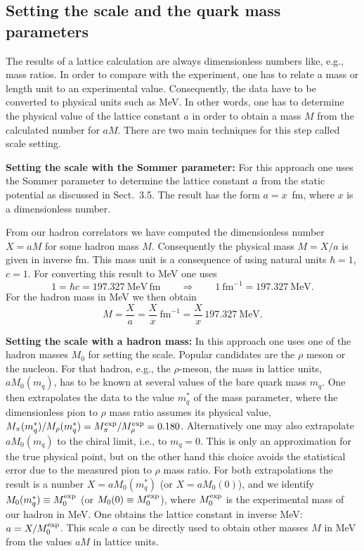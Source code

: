 \subsection{Setting the scale and the quark mass parameters}

The results of a lattice calculation are always dimensionless numbers like,
e.g., mass ratios. In order to compare with the experiment, one has to relate a
mass or length unit to an experimental value. Consequently, the data have to be
converted to physical units such as MeV. In other words, one has to determine
the physical value of the lattice constant $a$ in order to obtain a mass $M$
from the calculated number for $aM$. There are two main techniques for this
step called scale setting.

\textbf{Setting the scale with the Sommer parameter:} For this approach one
uses the Sommer parameter to determine the lattice constant $a$ from the static
potential as discussed in Sect.~3.5. The result has the form $a = x$~fm, where
$x$ is a dimensionless number.

From our hadron correlators we have computed the dimensionless number
$X = aM$ for some hadron mass $M$. Consequently the physical mass $M = X/a$ is
given in inverse fm. This mass unit is a consequence of using natural units
$\hbar = 1$, $c = 1$. For converting this result to MeV one uses
\begin{equation}
  1 = \hbar c = 197.327\ \mathrm{MeV\,fm}
  \qquad\Longrightarrow\qquad
  1\ \mathrm{fm}^{-1} = 197.327\ \mathrm{MeV} .
\end{equation}
For the hadron mass in MeV we then obtain
\begin{equation}
  M = \frac{X}{a} = \frac{X}{x}\ \mathrm{fm}^{-1} = \frac{X}{x}\,
    197.327\ \mathrm{MeV} .
\end{equation}

\textbf{Setting the scale with a hadron mass:} In this approach one uses one of
the hadron masses $M_0$ for setting the scale. Popular candidates are the
$\rho$ meson or the nucleon. For that hadron, e.g., the $\rho$-meson, the mass
in lattice units, $aM_0(m_q)$, has to be known at several values of the bare
quark mass $m_q$. One then extrapolates the data to the value $m_q^*$ of the
mass parameter, where the dimensionless pion to $\rho$ mass ratio assumes its
physical value, $M_\pi(m_q^*)/M_\rho(m_q^*) = M_\pi^{\rm exp}/M_\rho^{\rm exp} =
0.180$. Alternatively one may also extrapolate $aM_0(m_q)$ to the chiral limit,
i.e., to $m_q = 0$. This is only an approximation for the true physical point,
but on the other hand this choice avoids the statistical error due to the
measured pion to $\rho$ mass ratio. For both extrapolations the result is a
number $X = aM_0(m_q^*)$ (or $X = aM_0(0)$), and we identify
$M_0(m_q^*) \equiv M_0^{\rm exp}$ (or $M_0(0) \equiv M_0^{\rm exp}$), where
$M_0^{\rm exp}$ is the experimental mass of our hadron in MeV. One obtains the
lattice constant in inverse MeV: $a = X/M_0^{\rm exp}$. This scale $a$ can be
directly used to obtain other masses $M$ in MeV from the values $aM$ in lattice
units.

